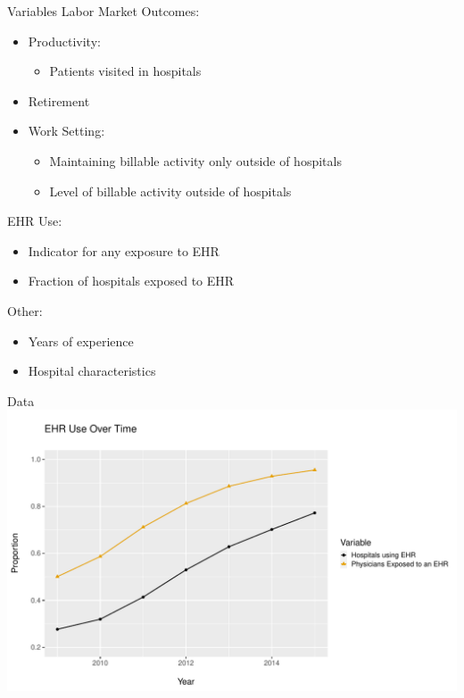 \documentclass[10pt]{beamer}
\begin{document}
\begin{frame}{Variables}
Labor Market Outcomes:
\begin{itemize}
\item Productivity:
\begin{itemize}
    \item Patients visited in hospitals
\end{itemize}
\end{itemize}
\begin{itemize}
\item Retirement
\end{itemize}
\begin{itemize}
\item Work Setting:
\begin{itemize}
    \item \color{gray} Maintaining billable activity only outside of hospitals
    \item \color{gray} Level of billable activity outside of hospitals
\end{itemize}
\end{itemize}

EHR Use:
\vspace{-2mm}
\begin{itemize}
    \item Indicator for any exposure to EHR
    \item \color{gray} Fraction of hospitals exposed to EHR
\end{itemize}

Other:
\vspace{-2mm}
\begin{itemize}
    \item Years of experience
    \item Hospital characteristics
\end{itemize}

\end{frame}


\begin{frame}{Data}
    \centering
    \includegraphics[scale=.5]{Objects/sum_stats_year.pdf}
\end{frame}
\end{document}
